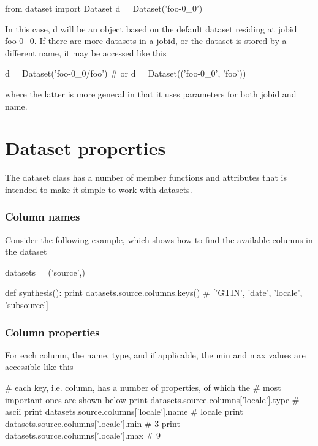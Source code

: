 \begin{python}
from dataset import Dataset
d = Dataset('foo-0_0')
\end{python}
In this case, d will be an object based on the default dataset
residing at jobid foo-0\_0.  If there are more datasets in a jobid, or
the dataset is stored by a different name, it may be accessed like
this

\begin{python}
d = Dataset('foo-0_0/foo')
# or
d = Dataset(('foo-0_0', 'foo'))
\end{python}
where the latter is more general in that it uses parameters for both
jobid and name.



\newpage
\section{Dataset properties}

The dataset class has a number of member functions and attributes that
is intended to make it simple to work with datasets.



\subsubsection{Column names}

Consider the
following example, which shows how to find the available columns in
the dataset

\begin{python}
datasets = ('source',)

def synthesis():
  print datasets.source.columns.keys()
  # ['GTIN', 'date', 'locale', 'subsource']
\end{python}



\subsubsection{Column properties}

For each column, the name, type, and if applicable, the min and max
values are accessible like this

\begin{python}
# each key, i.e. column, has a number of properties, of which the
# most important ones are shown below
print datasets.source.columns['locale'].type
# ascii
print datasets.source.columns['locale'].name
# locale
print datasets.source.columns['locale'].min
# 3
print datasets.source.columns['locale'].max
# 9
\end{python}


